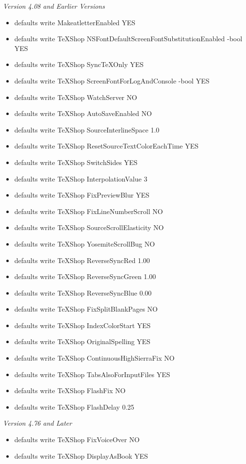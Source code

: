 \documentclass[11pt, oneside]{article}   	%
\begin{document}
\newpage
\vspace{.3in}
{\em Version 4.08 and Earlier Versions}
\begin{itemize}
\item defaults write MakeatletterEnabled YES
\item defaults write TeXShop NSFontDefaultScreenFontSubstitutionEnabled -bool YES
\item defaults write TeXShop SyncTeXOnly YES
\item defaults write TeXShop ScreenFontForLogAndConsole -bool YES
\item defaults write TeXShop WatchServer NO
\item defaults write TeXShop AutoSaveEnabled NO
\item defaults write TeXShop SourceInterlineSpace 1.0
\item defaults write TeXShop ResetSourceTextColorEachTime YES
\item defaults write TeXShop SwitchSides YES
\item defaults write TeXShop InterpolationValue 3
\item defaults write TeXShop FixPreviewBlur YES
\item defaults write TeXShop FixLineNumberScroll NO
\item defaults write TeXShop SourceScrollElasticity NO
\item defaults write TeXShop YosemiteScrollBug NO
\item defaults write TeXShop ReverseSyncRed 1.00 
\item defaults write TeXShop ReverseSyncGreen 1.00 
\item defaults write TeXShop ReverseSyncBlue 0.00
\item defaults write TeXShop FixSplitBlankPages NO
\item defaults write TeXShop IndexColorStart YES
\item defaults write TeXShop OriginalSpelling YES
\item defaults write TeXShop ContinuousHighSierraFix NO
\item defaults write TeXShop TabsAlsoForInputFiles YES
\item defaults write TeXShop FlashFix NO
\item defaults write TeXShop FlashDelay 0.25
\end{itemize}

\newpage
\vspace{.3in}
{\em Version 4.76 and Later}

\begin{itemize}
\item defaults write TeXShop FixVoiceOver NO
\item defaults write TeXShop DisplayAsBook YES
\end{itemize}
\end{document}
